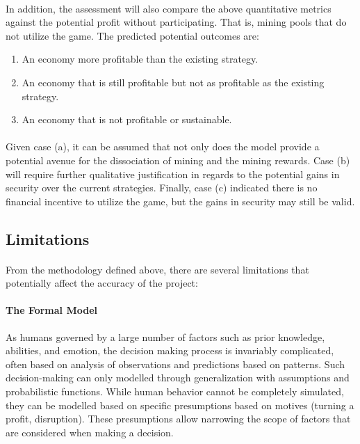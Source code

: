 \paragraph{} In addition, the assessment will also compare the above quantitative metrics against the potential profit without participating. That is, mining pools that do not utilize the game. The predicted potential outcomes are:

\renewcommand{\labelenumi}{(\alph{enumi})}
\begin{enumerate}
  \item An economy more profitable than the existing strategy. 
  \item An economy that is still profitable but not as profitable as the existing strategy.
  \item An economy that is not profitable or sustainable. %
\end{enumerate}

\paragraph{} Given case (a), it can be assumed that not only does the model provide a potential avenue for the dissociation of mining and the mining rewards. Case (b) will require further qualitative justification in regards to the potential gains in security over the current strategies. Finally, case (c) indicated there is no financial incentive to utilize the game, but the gains in security may still be valid.


\subsection{Limitations}

\paragraph{} From the methodology defined above, there are several limitations that potentially affect the accuracy of the project:

\paragraph{The Formal Model} As humans governed by a large number of factors such as prior knowledge, abilities, and emotion, the decision making process is invariably complicated, often based on analysis of observations and predictions based on patterns. Such decision-making can only modelled through generalization with assumptions and probabilistic functions. While human behavior cannot be completely simulated, they can be modelled based on specific presumptions based on motives (turning a profit, disruption). These presumptions allow narrowing the scope of factors that are considered when making a decision.

